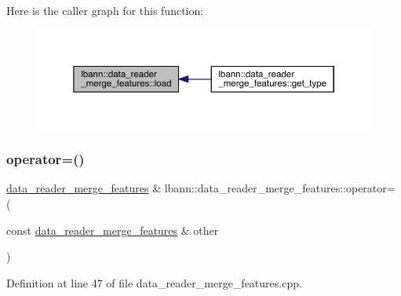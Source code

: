 Here is the caller graph for this function\+:\nopagebreak
\begin{figure}[H]
\begin{center}
\leavevmode
\includegraphics[width=350pt]{classlbann_1_1data__reader__merge__features_a8a618de9a92cb148746a83b0381ba781_icgraph}
\end{center}
\end{figure}
\mbox{\label{classlbann_1_1data__reader__merge__features_a2df9360e463c2ceaf4ba42e287f673b9}} 
\subsubsection{\texorpdfstring{operator=()}{operator=()}}
{\footnotesize\ttfamily \hyperlink{classlbann_1_1data__reader__merge__features}{data\+\_\+reader\+\_\+merge\+\_\+features} \& lbann\+::data\+\_\+reader\+\_\+merge\+\_\+features\+::operator= (\begin{DoxyParamCaption}\item[{const \hyperlink{classlbann_1_1data__reader__merge__features}{data\+\_\+reader\+\_\+merge\+\_\+features} \&}]{other }\end{DoxyParamCaption})}



Definition at line 47 of file data\+\_\+reader\+\_\+merge\+\_\+features.\+cpp.


